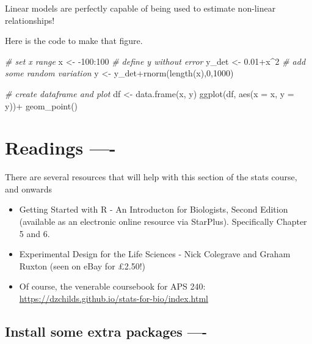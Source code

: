 \documentclass[
]{book}
\newenvironment{Shaded}{\begin{snugshade}}{\end{snugshade}}
\newcommand{\AttributeTok}[1]{\textcolor[rgb]{0.77,0.63,0.00}{#1}}
\newcommand{\CommentTok}[1]{\textcolor[rgb]{0.56,0.35,0.01}{\textit{#1}}}
\newcommand{\DecValTok}[1]{\textcolor[rgb]{0.00,0.00,0.81}{#1}}
\newcommand{\FloatTok}[1]{\textcolor[rgb]{0.00,0.00,0.81}{#1}}
\newcommand{\FunctionTok}[1]{\textcolor[rgb]{0.00,0.00,0.00}{#1}}
\newcommand{\NormalTok}[1]{#1}
\newcommand{\OtherTok}[1]{\textcolor[rgb]{0.56,0.35,0.01}{#1}}
\newcommand{\SpecialCharTok}[1]{\textcolor[rgb]{0.00,0.00,0.00}{#1}}
\providecommand{\tightlist}{%
  \setlength{\itemsep}{0pt}\setlength{\parskip}{0pt}}
\begin{document}
Linear models are perfectly capable of being used to estimate non-linear relationships!

Here is the code to make that figure.

\begin{Shaded}
\begin{Highlighting}[]
\CommentTok{\# set x range}
\NormalTok{x }\OtherTok{\textless{}{-}} \SpecialCharTok{{-}}\DecValTok{100}\SpecialCharTok{:}\DecValTok{100}
\CommentTok{\# define y without error}
\NormalTok{y\_det }\OtherTok{\textless{}{-}} \FloatTok{0.01}\SpecialCharTok{+}\NormalTok{x}\SpecialCharTok{\^{}}\DecValTok{2}
\CommentTok{\# add some random variation}
\NormalTok{y }\OtherTok{\textless{}{-}}\NormalTok{ y\_det}\SpecialCharTok{+}\FunctionTok{rnorm}\NormalTok{(}\FunctionTok{length}\NormalTok{(x),}\DecValTok{0}\NormalTok{,}\DecValTok{1000}\NormalTok{)}

\CommentTok{\# create dataframe and plot}
\NormalTok{df }\OtherTok{\textless{}{-}} \FunctionTok{data.frame}\NormalTok{(x, y)}
\FunctionTok{ggplot}\NormalTok{(df, }\FunctionTok{aes}\NormalTok{(}\AttributeTok{x =}\NormalTok{ x, }\AttributeTok{y =}\NormalTok{ y))}\SpecialCharTok{+}
  \FunctionTok{geom\_point}\NormalTok{()}
\end{Highlighting}
\end{Shaded}

\hypertarget{readings--}{%
\chapter{Readings ----}\label{readings--}}

There are several resources that will help with this section of the stats course, and onwards

\begin{itemize}
\tightlist
\item
  Getting Started with R - An Introducton for Biologists, Second Edition (available as an electronic online resource via StarPlus). Specifically Chapter 5 and 6.
\item
  Experimental Design for the Life Sciences - Nick Colegrave and Graham Ruxton (seen on eBay for £2.50!)
\item
  Of course, the venerable coursebook for APS 240: \url{https://dzchilds.github.io/stats-for-bio/index.html}
\end{itemize}

\hypertarget{install-some-extra-packages--}{%
\section{Install some extra packages ----}\label{install-some-extra-packages--}}
\end{document}

